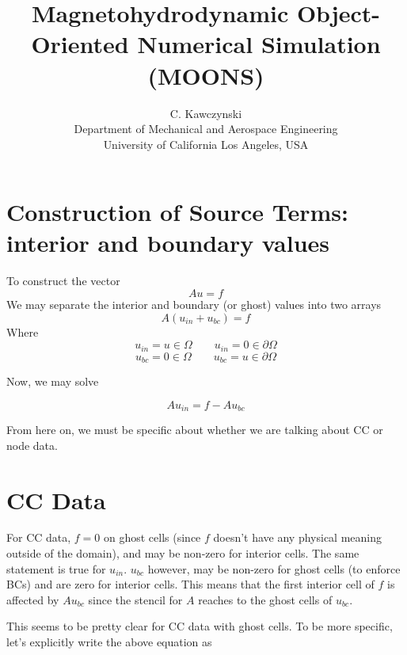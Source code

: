 \documentclass[11pt]{article}
\begin{document}
\doublespacing
\title{Magnetohydrodynamic Object-Oriented Numerical Simulation (MOONS)}
\author{C. Kawczynski \\
Department of Mechanical and Aerospace Engineering \\
University of California Los Angeles, USA\\
}
\maketitle


\section{Construction of Source Terms: interior and boundary values}
To construct the vector
\begin{equation}
Au=f
\end{equation}
We may separate the interior and boundary (or ghost) values into two arrays
\begin{equation}
A(u_{in} + u_{bc}) = f
\end{equation}
Where
\begin{equation}
u_{in} = u \in \Omega \qquad u_{in} = 0 \in \partial \Omega
\end{equation}
\begin{equation}
u_{bc} = 0 \in \Omega \qquad u_{bc} = u \in \partial \Omega
\end{equation}

Now, we may solve

\begin{equation}
Au_{in} = f - Au_{bc}
\end{equation}

From here on, we must be specific about whether we are talking about CC or node data.

\section{CC Data}
For CC data, $f = 0$ on ghost cells (since $f$ doesn't have any physical meaning outside of the domain), and may be non-zero for interior cells. The same statement is true for $u_{in}$. $u_{bc}$ however, may be non-zero for ghost cells (to enforce BCs) and are zero for interior cells. This means that the first interior cell of $f$ is affected by $Au_{bc}$ since the stencil for $A$ reaches to the ghost cells of $u_{bc}$.

This seems to be pretty clear for CC data with ghost cells.
To be more specific, let's explicitly write the above equation as
\end{document}
